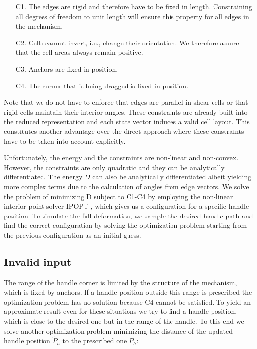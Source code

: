 \begin{itemize}
	\item [C1.] The edges are rigid and therefore have to be fixed in length. Constraining all degrees of freedom to unit length will ensure this property for all edges in the mechanism.
	\item [C2.] Cells cannot invert, i.e., change their orientation. We therefore assure that the cell areas always remain positive.
	\item [C3.] Anchors are fixed in position.
    \item [C4.] The corner that is being dragged is fixed in position.
\end{itemize}
    
Note that we do not have to enforce that edges are parallel in shear cells or that rigid cells maintain their interior angles. These constraints are already built into the reduced representation and each state vector induces a valid cell layout. This constitutes another advantage over the direct approach where these constraints have to be taken into account explicitly.

Unfortunately, the energy and the constraints are non-linear and non-convex. However, the constraints are only quadratic and they can be analytically differentiated. The energy $D$ can also be analytically differentiated albeit yielding more complex terms due to the calculation of angles from edge vectors.
We solve the problem of minimizing D subject to C1-C4 by employing the non-linear interior point solver IPOPT \todo{[46]}, which gives us a configuration for a specific handle position. To simulate the full deformation, we sample the desired handle path and find the correct configuration by solving the optimization problem starting from the previous configuration as an initial guess.


\subsection{Invalid input}

The range of the handle corner is limited by the structure of the mechanism, which is fixed by anchors. If a handle position outside this range is prescribed the optimization problem has no solution because C4 cannot be satisfied. To yield an approximate result even for these situations we try to find a handle position, which is close to the desired one but in the range of the handle. To this end we solve another optimization problem minimizing the distance of the updated handle position ${\widetilde{P}}_h$ to the prescribed one $P_h$:

